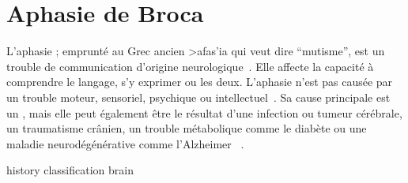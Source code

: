 \chapter{Aphasie de Broca}

L'aphasie ; emprunté au Grec ancien \textgreek{>afas'ia} qui veut dire ``mutisme'',
est un trouble de communication d'origine neurologique~\cite{Larousse}. 
Elle affecte la capacité à comprendre le langage, s'y exprimer ou les deux.
L'aphasie n'est pas causée par un trouble moteur, sensoriel, psychique ou intellectuel~\cite{Chapey_2008}.
Sa cause principale est un , 
mais elle peut également être le résultat d'une infection ou tumeur cérébrale, un traumatisme crânien, 
un trouble métabolique comme le diabète ou une maladie neurodégénérative comme l'Alzheimer ~\cite{Hallowell_2017}.

{history}
{classification}
{brain}